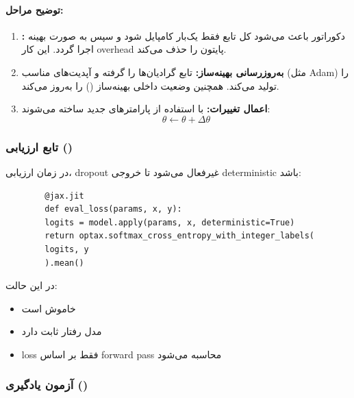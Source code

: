 \documentclass{article}
\begin{document}
\paragraph{توضیح مراحل:}

\begin{enumerate}
	\item \textbf{:} دکوراتور  باعث می‌شود کل تابع فقط یک‌بار کامپایل شود و سپس به صورت بهینه اجرا گردد. این کار overhead پایتون را حذف می‌کند.
	
	
	
	\item \textbf{به‌روزرسانی بهینه‌ساز:} تابع  گرادیان‌ها را گرفته و آپدیت‌های مناسب (مثل Adam) را تولید می‌کند. همچنین وضعیت داخلی بهینه‌ساز () را به‌روز می‌کند.
	
	\item \textbf{اعمال تغییرات:} با استفاده از  پارامترهای جدید ساخته می‌شوند:
	\[
	\theta \leftarrow \theta + \Delta \theta
	\]
\end{enumerate}

\subsubsection*{تابع ارزیابی ()}

در زمان ارزیابی، dropout غیرفعال می‌شود تا خروجی deterministic باشد:

\begin{latin}
	\begin{verbatim}
		@jax.jit
		def eval_loss(params, x, y):
		logits = model.apply(params, x, deterministic=True)
		return optax.softmax_cross_entropy_with_integer_labels(
		logits, y
		).mean()
	\end{verbatim}
\end{latin}

در این حالت:

\begin{itemize}
	\item {} خاموش است
	\item مدل رفتار ثابت دارد
	\item loss فقط بر اساس forward pass محاسبه می‌شود
\end{itemize}

\subsubsection*{آزمون یادگیری ()}
\end{document}
